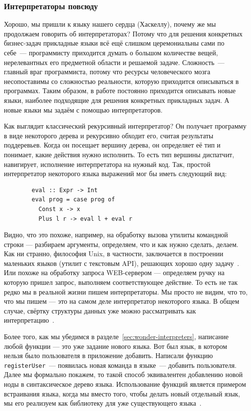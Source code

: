 \documentclass[12pt]{article}
\begin{document}
    \subsubsection{Интерпретаторы повсюду}

    Хорошо, мы пришли к языку нашего сердца (Хаскеллу), почему же мы продолжаем говорить об интерпретаторах?
    Потому что для решения конкретных бизнес-задач прикладные языки всё ещё слишком церемониальны сами по себе~--- программисту приходится думать о большом количестве вещей, нерелевантных его предметной области и решаемой задаче.
    Сложность~--- главный враг программиста, потому что ресурсы человеческого мозга несопоставимы со сложностью реальности, которую приходится описываться в программах.
    Таким образом, в работе постоянно приходится описывать новые языки, наиболее подходящие для решения конкретных прикладных задач.
    А новые языки мы задаём с помощью интерпретаторов.

    Как выглядит классический рекурсивный интерпретатор?
    Он получает программу в виде некоторого дерева и рекурсивно обходит его, считая результаты поддеревьев.
    Когда он посещает вершину дерева, он определяет её тип и понимает, какие действия нужно исполнить.
    То есть тип вершины диспатчит, навигирует, исполнение интерпретатора на нужный код.
    Так, простой интерпретатор некоторого языка выражений мог бы иметь следующий вид:
    \begin{verbatim}
        eval :: Expr -> Int
        eval prog = case prog of
          Const x -> x
          Plus l r -> eval l + eval r
    \end{verbatim}

    Видно, что это похоже, например, на обработку вызова утилиты командной строки --- разбираем аргументы, определяем, что и как нужно сделать, делаем.
    Как ни странно, философия Unix, в частности, заключается в построении маленьких языков (утилит с текстовым API), решающих хорошо одну задачу~\cite{bentley1986little}.
    Или похоже на обработку запроса WEB-сервером --- определяем ручку на которую пришел запрос, выполняем соответствующее действие.
    То есть не так редко мы в реальной жизни пишем интерпретаторы.
    Мы просто не видим, что то, что мы пишем --- это на самом деле интерпретатор некоторого языка.
    В общем случае, свёртку структуры данных уже можно рассматривать как интерпретацию~\cite{gibbons2014folding}.

    Более того, как мы убедимся в разделе~\ref{sec:wonder-interpreters}, написание любой функции --- это уже задание нового языка.
    Вот был язык, в котором нельзя было пользователя в приложение добавить.
    Написали функцию \texttt{registerUser}~--- появилась новая команда в языке~--- добавить пользователя.
    Далее мы формально покажем, то такой способ эквивалентен добавлению новой ноды в синтаксическое дерево языка.
    Использование функций является примером встраивания языка, когда мы вместо того, чтобы делать новый отдельный язык, мы его реализуем как библиотеку для уже существующего языка~\cite{gibbons2013functional}.
\end{document}
